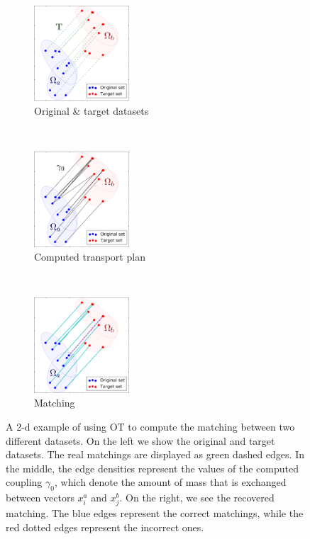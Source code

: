\begin{figure}[t!]
    \centering
    \begin{subfigure}[t]{0.32\textwidth}
        \centering
        \includegraphics[height=1.4in]{6.matching/img/one}
        \caption{{\scriptsize Original \& target datasets}}
        \label{fig:otprob_a}
    \end{subfigure}%
    ~ 
    \begin{subfigure}[t]{0.32\textwidth}
        \centering
        \includegraphics[height=1.4in]{6.matching/img/two}
        \caption{{\scriptsize Computed transport plan}}
        \label{fig:otprob_b}
    \end{subfigure}
    ~
    \begin{subfigure}[t]{0.32\textwidth}
        \centering
        \includegraphics[height=1.4in]{6.matching/img/three}
        \caption{{\scriptsize Matching}}
        \label{fig:otprob_c}
    \end{subfigure}
    \caption{{\footnotesize A 2-d example of using OT to compute the matching between two different datasets. On the left we show the original and target datasets. The real matchings are displayed as green dashed edges. In the middle, the edge densities represent the values of the computed coupling $\gamma_0$, which denote the amount of mass that is exchanged between vectors $x_i^a$ and $x_j^b$. On the right, we see the recovered matching. The blue edges represent the correct matchings, while the red dotted edges represent the incorrect ones.}}
    \label{fig:otprob}
\end{figure}

